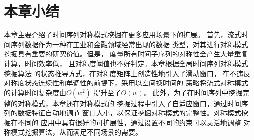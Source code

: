 \section{本章小结}
本章主要介绍了时间序列对称模式挖掘在更多应用场景下的扩展。
首先，流式时间序列数据作为一种在工业和金融领域经常出现的数据
类型，对其进行对称模式挖掘具有重要的研究价值。但是，
度量所有时间子序列的对称性会产生大量重复计算，时间效率低，
且对称度阈值也不好判定。本章根据全局时间序列对称模式挖掘算法
的状态推导方式，在对称度矩阵上创造性地引入了滑动窗口，
在不违反对称度状态连续性和单调性的前提下，采用以空间换时间的
策略将流式对称模式的计算时间复杂度由$O\left(w^2\right)$
提升至了$O\left(w\right)$。
此外，为了在时间序列中挖掘完整的对称模式，本章还在对称模式的
挖掘过程中引入了自适应窗口，通过时间序列的数据特征自动地调节
窗口大小，以保证挖掘对称模式的完整性。对称模式挖掘在不同的
应用中具有很好的可扩展性，通过设置不同的约束可以灵活地调整
对称模式挖掘算法，从而满足不同场景的需要。








